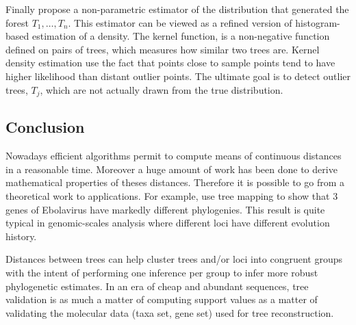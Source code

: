 Finally \citet{weyenberg2014kdetrees}  propose  a non-parametric estimator of the distribution that generated the forest $T_1,\ldots,T_n$.  This estimator can be viewed as a refined version of histogram-based estimation of a density. The kernel function, is a non-negative function defined on pairs of trees, which measures how similar two trees are. Kernel density estimation use the fact that points close to sample points tend to have higher likelihood than distant outlier points.  The ultimate goal is to detect outlier trees, $T_j$, which are not actually drawn from the true distribution.


%

\subsection{Conclusion}

Nowadays efficient algorithms permit to compute means of continuous distances in a reasonable time. Moreover a huge amount of work has been done to derive mathematical properties of theses distances. Therefore it is possible to go from a theoretical work to applications. For example, \citet{Kendall2016} use tree mapping to show that 3 genes of Ebolavirus have markedly different phylogenies. This result is quite typical in genomic-scales analysis where different loci have different evolution history.

Distances between trees can help cluster trees and/or loci into congruent groups with the intent of performing one inference per group to infer more robust phylogenetic estimates. In an era of cheap and abundant sequences, tree validation is as much a matter of computing support values as a matter of validating the molecular data (taxa set, gene set) used for tree reconstruction. 